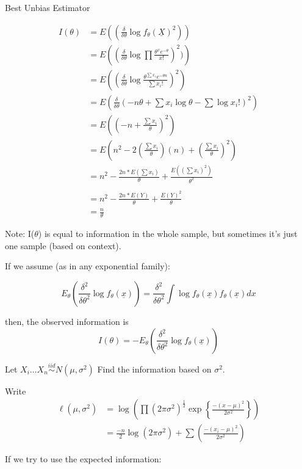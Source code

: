 \documentclass[11pt,fleqn]{book} %
\begin{document}
\begin{section}{Best Unbias Estimator}
\begin{exercise}
	\begin{align*}
		I(\theta) &= E\left((\frac{\delta}{\delta \theta}\log f_\theta(\underline{X})^2) \right)\\
				&=E\left((\frac{\delta}{\delta \theta}\log \prod \frac{\theta^x e^{-\theta}}{x!})^2) \right)\\
				&= E\left((\frac{\delta}{\delta \theta}\log \frac{\theta^{\sum x_i} e^{-\theta n}}{\sum x_i!})^2 \right)\\
				&= E\left(\frac{\delta}{\delta \theta}(-n\theta + \sum x_i \log \theta - \sum \log x_i!)^2  \right)\\
				&= E\left((-n+\frac{\sum x_i}{\theta})^2 \right)\\
				&= E\left( n^2 - 2(\frac{\sum x_i}{\theta})(n)+(\frac{\sum x_i}{\theta})^2 \right)\\
				&= n^2 -\frac{2n * E(\sum x_i)}{\theta} + \frac{E((\sum x_i)^2)}{\theta^2}\\
				\\
				&=n^2 - \frac{2n*E(Y)}{\theta} + \frac{E(Y)^2}{\theta}\\
				&=\frac{n}{\theta}
	\end{align*}
\end{exercise}

Note: I($\theta$) is equal to information in the whole sample, but sometimes it's just one sample (based on context).

If we assume (as in any exponential family):

$$E_\theta \left(\frac{\delta^2}{\delta \theta^2}\log f_\theta(\underline{x})\right) = \frac{\delta^2}{\delta \theta^2}\int{\log f_{\theta}(\underline{x})}f_\theta(\underline{x})dx$$
  
then, the observed information is 
$$I(\theta) = - E_\theta \left(\frac{\delta^2}{\delta \theta^2}\log f_\theta(\underline{x})\right) $$

\begin{example}
	Let $X_i \dots X_n \stackrel{iid}{\sim} N(\mu,\sigma^2)$
Find the information based on $\sigma^2$.

	Write 
\begin{align*}
	\ell(\mu,\sigma^2) &=\log\left(\prod (2\pi\sigma^2)^{\frac{1}{2}} \exp\left\{\frac{-(x-\mu)^2}{2\sigma^2}\right\}\right)\\
	&= \frac{-n}{2} \log(2\pi\sigma^2) +\sum \left(\frac{-(x_i-\mu)^2}{2\sigma^2} \right)
	\end{align*}

If we try to use the expected information: 


\end{example}
\end{section}
\end{document}
